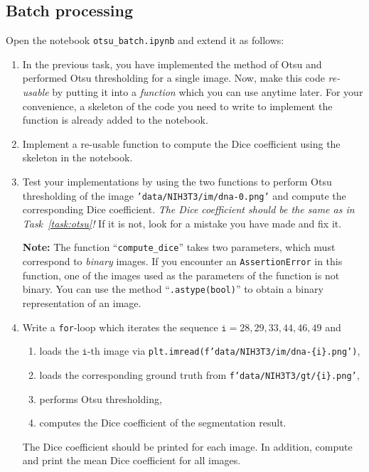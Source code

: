 \documentclass[12pt,a4paper]{article}
\begin{document}
\begin{samepage}
\section{Batch processing}
\label{task:otsu_batch}

Open the notebook \texttt{otsu\_batch.ipynb} and extend it as follows:

\begin{enumerate}
    \item In the previous task, you have implemented the method of Otsu and performed Otsu thresholding for a single image. Now, make this code \emph{re-usable} by putting it into a \emph{function} which you can use anytime later. For your convenience, a skeleton of the code you need to write to implement the function is already added to the notebook.
    \item Implement a re-usable function to compute the Dice coefficient using the skeleton in the notebook.
    \item Test your implementations by using the two functions to perform Otsu thresholding of the image \texttt{'data/NIH3T3/im/dna-0.png'} and compute the corresponding Dice coefficient. \emph{The Dice coefficient should be the same as in Task~\ref{task:otsu}!} If it is not, look for a mistake you have made and fix it.

    \textbf{Note:} The function ``\texttt{compute\_dice}'' takes two parameters, which must correspond to \emph{binary} images. If you encounter an \texttt{AssertionError} in this function, one of the images used as the parameters of the function is not binary. You can use the method ``\texttt{.astype(bool)}'' to obtain a binary representation of an image.
    
    \item Write a \texttt{for}-loop which iterates the sequence $\texttt{i} = 28,29,33,44,46,49$ and
    \begin{enumerate}
        \item loads the $\texttt{i}$-th image via \texttt{plt.imread(f'data/NIH3T3/im/dna-\{i\}.png')},
        \item loads the corresponding ground truth from \texttt{f'data/NIH3T3/gt/\{i\}.png'},
        \item performs Otsu thresholding,
        \item computes the Dice coefficient of the segmentation result.
    \end{enumerate}
    The Dice coefficient should be printed for each image. In addition, compute and print the mean Dice coefficient for all images.
\end{enumerate}
\end{samepage}
\end{document}
